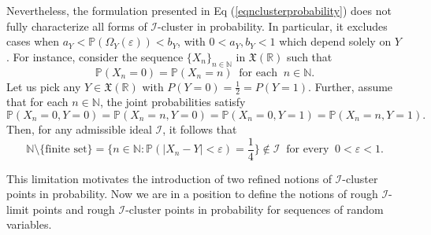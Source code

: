 \documentclass[reqno]{amsart}
\begin{document}
\begin{remark}
Nevertheless, the formulation presented in Eq (\ref{eqnclusterprobability}) does not fully characterize all forms of $\mathcal{I}$-cluster in probability. In particular, it excludes cases when $a_Y <\mathbb{P}(\Omega_Y(\varepsilon))<b_Y$, with $0<a_Y,b_Y<1$ which depend solely on $Y$. For instance, consider the sequence $\{X_n\}_{n\in\mathbb{N}}$ in $\mathfrak{X}(\mathbb{R})$ such that 
$$\mathbb{P}(X_n=0)=\mathbb{P}(X_n=n)~\mbox{ for each }~ n\in\mathbb{N}.$$
Let us pick any $Y\in\mathfrak{X}(\mathbb{R})$ with $P(Y=0)=\frac{1}{2}=P(Y=1)$. Further, assume that for each $n\in\mathbb{N}$, the joint probabilities satisfy $$\mathbb{P}(X_n=0,Y=0)=\mathbb{P}(X_n=n,Y=0)=\mathbb{P}(X_n=0,Y=1)=\mathbb{P}(X_n=n,Y=1).$$
Then, for any admissible ideal $\mathcal{I}$, it follows that 
$$
\mathbb{N}\setminus\{\mbox{finite set\}}=\{n \in \mathbb{N} : \mathbb{P}(|X_n-Y| < \varepsilon) = \frac{1}{4}\} \notin \mathcal{I}~\mbox{ for every }~0<\varepsilon<1.
$$

\end{remark}
This limitation motivates the introduction of two refined notions of $\mathcal{I}$-cluster points in probability. Now we are in a position to define the notions of rough $\mathcal{I}$-limit points and rough $\mathcal{I}$-cluster points in probability for sequences of random variables. 
	
\end{document}
